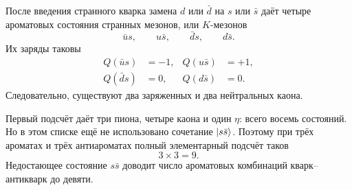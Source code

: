 После введения странного кварка замена \(d\) или \(\bar d\) на \(s\) или \(\bar s\) даёт четыре ароматовых состояния странных мезонов, или \(K\)-мезонов
\begin{equation}
\bar u s,\qquad u\bar s,\qquad \bar d s,\qquad d\bar s.
\end{equation}
Их заряды таковы
\begin{align}
Q(\bar u s) &=-1,
&
Q(u\bar s) &=+1,
\\
Q(\bar d s) &=0,
&
Q(d\bar s) &=0.
\end{align}
Следовательно, существуют два заряженных и два нейтральных каона.

Первый подсчёт даёт три пиона, четыре каона и один \(\eta\): всего восемь состояний. Но в этом списке ещё не использовано сочетание \(\left\lvert s\bar s\right\rangle\). Поэтому при трёх ароматах и трёх антиароматах полный элементарный подсчёт таков
\begin{equation}
3\times3=9.
\end{equation}
Недостающее состояние \(s\bar s\) доводит число ароматовых комбинаций кварк--антикварк до девяти.